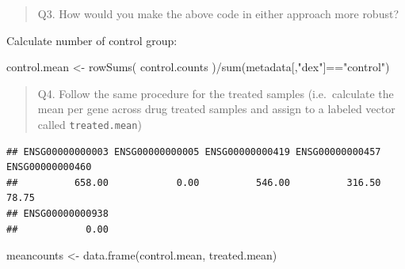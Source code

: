 \documentclass[
]{article}
\newenvironment{Shaded}{\begin{snugshade}}{\end{snugshade}}
\newcommand{\FunctionTok}[1]{\textcolor[rgb]{0.00,0.00,0.00}{#1}}
\newcommand{\NormalTok}[1]{#1}
\newcommand{\OtherTok}[1]{\textcolor[rgb]{0.56,0.35,0.01}{#1}}
\newcommand{\SpecialCharTok}[1]{\textcolor[rgb]{0.00,0.00,0.00}{#1}}
\newcommand{\StringTok}[1]{\textcolor[rgb]{0.31,0.60,0.02}{#1}}
\begin{document}
\begin{quote}
Q3. How would you make the above code in either approach more robust?
\end{quote}

Calculate number of control group:

\begin{Shaded}
\begin{Highlighting}[]
\NormalTok{control.mean }\OtherTok{\textless{}{-}} \FunctionTok{rowSums}\NormalTok{( control.counts )}\SpecialCharTok{/}\FunctionTok{sum}\NormalTok{(metadata[,}\StringTok{"dex"}\NormalTok{]}\SpecialCharTok{==}\StringTok{"control"}\NormalTok{)}
\end{Highlighting}
\end{Shaded}

\begin{quote}
Q4. Follow the same procedure for the treated samples (i.e.~calculate
the mean per gene across drug treated samples and assign to a labeled
vector called \texttt{treated.mean})
\end{quote}

\begin{Shaded}
\end{Shaded}

\begin{verbatim}
## ENSG00000000003 ENSG00000000005 ENSG00000000419 ENSG00000000457 ENSG00000000460 
##          658.00            0.00          546.00          316.50           78.75 
## ENSG00000000938 
##            0.00
\end{verbatim}

\begin{Shaded}
\begin{Highlighting}[]
\NormalTok{meancounts }\OtherTok{\textless{}{-}} \FunctionTok{data.frame}\NormalTok{(control.mean, treated.mean)}
\end{Highlighting}
\end{Shaded}
\end{document}
